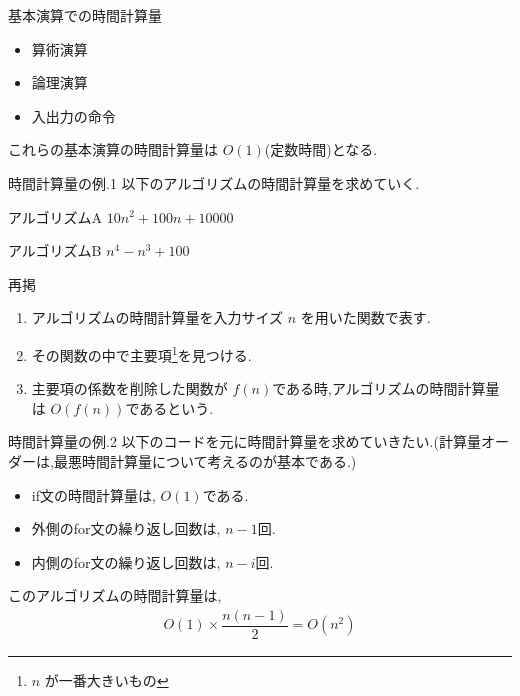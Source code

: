 \begin{frame}{基本演算での時間計算量}
\begin{block}{}
        \begin{itemize}
        \item 算術演算
        \item 論理演算
        \item 入出力の命令
    \end{itemize}
    これらの基本演算の時間計算量は $O(1)$(定数時間)となる.
\end{block}
\end{frame}

\begin{frame}{時間計算量の例.1}
    以下のアルゴリズムの時間計算量を求めていく.
    \begin{exampleblock}{アルゴリズムA}
        $10n^2 + 100n + 10000$
    \end{exampleblock}
    \begin{exampleblock}{アルゴリズムB}
        $n^4 - n^3 + 100$
    \end{exampleblock}

        \begin{block}{再掲}
        \begin{enumerate}
            \item アルゴリズムの時間計算量を入力サイズ $n$ を用いた関数で表す.
            \item その関数の中で主要項\footnote{$n$ が一番大きいもの}を見つける.
            \item 主要項の係数を削除した関数が $f(n)$である時,アルゴリズムの時間計算量は $O(f(n))$であるという.
        \end{enumerate}
    \end{block}
\end{frame}

\begin{frame}[fragile]{時間計算量の例.2}
以下のコードを元に時間計算量を求めていきたい.(計算量オーダーは,最悪時間計算量について考えるのが基本である.)
    
\begin{exampleblock}{}
    \begin{itemize}
        \item if文の時間計算量は, $O(1)$である.
        \item 外側のfor文の繰り返し回数は, $n - 1$回.
        \item 内側のfor文の繰り返し回数は, $n - i$回.
    \end{itemize}
    このアルゴリズムの時間計算量は,
    \begin{align*}
        O(1) \times \dfrac{n(n - 1)}{2} = O(n^2)
    \end{align*}
\end{exampleblock}
\end{frame}

